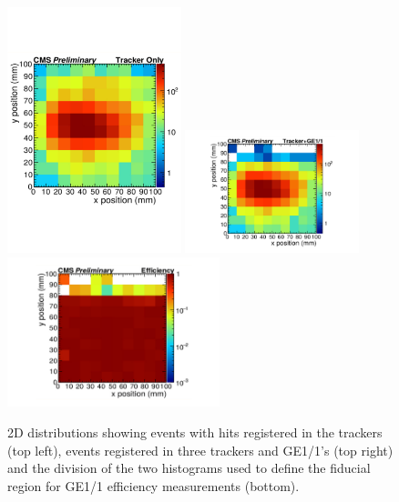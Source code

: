 \begin{figure}[htbp]
    \centering
    \includegraphics[width=0.45\textwidth]{figures/GEM/FiducialAreaCal_TrackerOnly.pdf}%
    \includegraphics[width=0.45\textwidth]{figures/GEM/FiducialAreaCal_TrackerGE11.pdf}\\
    \includegraphics[width=0.55\textwidth]{figures/GEM/FiducialAreaCal_Selection.pdf}\\
    \caption{2D distributions showing events with hits registered in the trackers (top left), events registered in three trackers and GE1/1's (top right) and the division of the two histograms used to define the fiducial region for GE1/1 efficiency measurements (bottom).}
    \label{fig:fiducial_area_sel}
\end{figure}
